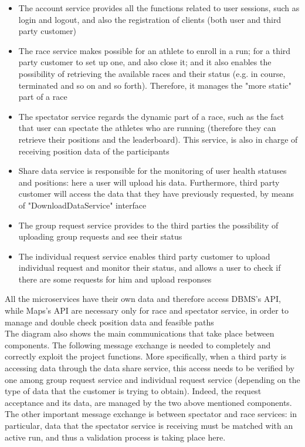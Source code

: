 \begin{itemize}
\item The account service provides all the functions related to user sessions, such as login and logout,
and also the registration of clients (both user and third party customer)
\item The race service makes possible for an athlete to enroll in a run; for a third party customer to set
up one, and also close it; and it also enables the possibility of retrieving the available races and their
status (e.g. in course, terminated and so on and so forth). Therefore, it manages the "more static" part
of a race
\item The spectator service regards the dynamic part of a race, such as the fact that user can spectate
the athletes who are running (therefore they can retrieve their positions and the leaderboard). This
service, is also in charge of receiving position data of the participants
\item Share data service is responsible for the monitoring of user health statuses and positions: here a
user will upload his data. Furthermore, third party customer will access the data that they have
previously requested, by means of "DownloadDataService" interface
\item The group request service provides to the third parties the possibility of uploading group requests and see their status 
\item The individual request service enables third party customer to upload individual request and monitor their status, and allows a user to check if there are some requests for him and upload responses 
\end{itemize}

All the microservices have their own data and therefore access DBMS's API, while Maps's API are necessary 
only for race and spectator service, in order to manage and double check position data and feasible paths
\\
The diagram also shows the main communications that take place between components. The following message exchange is needed to completely and
correctly exploit the project functions. More specifically, when a third party is accessing data through the data share service, this access
needs to be verified by one among group request service and individual request service (depending on the type of data that the customer is
trying to obtain). Indeed, the request acceptance and its data, are managed by the two above mentioned components. \\ 
The other important message exchange is between spectator and race services: in particular, data that the spectator service is receiving must
be matched with an active run, and thus a validation process is taking place here. \\